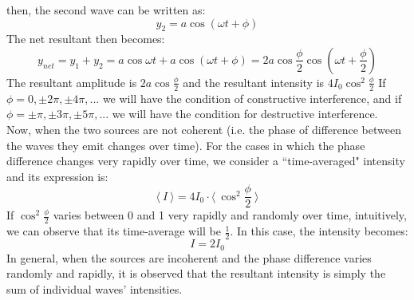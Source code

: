 \documentclass{article}
\begin{document}
then, the second wave can be written as:
\begin{equation*}
    y_{2} = a\cos{(\omega t + \phi)}
\end{equation*}
The net resultant then becomes:
\begin{equation*}
    y_{net} = y_{1} + y_{2} = a\cos{\omega t} + a\cos{(\omega t + \phi)} = 2a\cos{\frac{\phi}{2}}\cos{(\omega t + \frac{\phi}{2})}
\end{equation*}
The resultant amplitude is $2a\cos{\frac{\phi}{2}}$ and the resultant intensity is $4I_{0}\cos^{2}{\frac{\phi}{2}}$ If $\phi = 0, \pm 2\pi, \pm 4\pi,...$ we will have the condition of constructive interference, and if $\phi = \pm \pi, \pm 3 \pi, \pm 5 \pi,...$ we will have the condition for destructive interference.
\\ \newline
Now, when the two sources are not coherent (i.e. the phase of difference between the waves they emit changes over time). For the cases in which the phase difference changes very rapidly over time, we consider a ``time-averaged" intensity and its expression is:
\begin{equation*}
    \langle \ I \ \rangle = 4I_{0} \cdot \langle \ \cos^{2}{\frac{\phi}{2}} \ \rangle 
\end{equation*}
If $\cos^{2}{\frac{\phi}{2}}$ varies between 0 and 1 very rapidly and randomly over time, intuitively, we can observe that its time-average will be $\frac{1}{2}$. In this case, the intensity becomes:
\begin{equation*}
    I = 2I_{0}
\end{equation*}
In general, when the sources are incoherent and the phase difference varies randomly and rapidly, it is observed that the resultant intensity is simply the sum of individual waves' intensities. 
\end{document}
